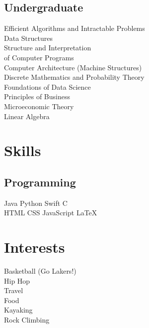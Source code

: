 \documentclass[]{deedy-resume-openfont}
\begin{document}
\begin{minipage}[t]{0.33\textwidth}
\subsection{Undergraduate}
Efficient Algorithms and Intractable Problems \\
Data Structures \\
Structure and Interpretation \\of Computer Programs \\
Computer Architecture (Machine Structures) \\
Discrete Mathematics and Probability Theory \\
Foundations of Data Science \\
Principles of Business \\
Microeconomic Theory \\
Linear Algebra \\
\sectionsep


\section{Skills}
\subsection{Programming}
Java \textbullet{}   Python \textbullet{} Swift \textbullet{} C \\

HTML \textbullet{} CSS \textbullet{} JavaScript \textbullet{} \LaTeX
\sectionsep


\section{Interests}
Basketball (Go Lakers!)\\
Hip Hop\\
Travel\\
Food\\
Kayaking\\
Rock Climbing


%
%

\end{minipage} 
\hfill
\end{document}
